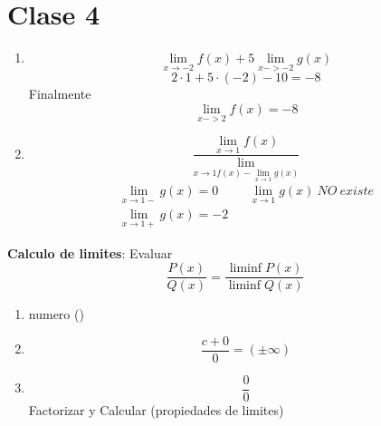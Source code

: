 \documentclass{article}
\begin{document}
    \section{Clase 4}
    \begin{enumerate}
        \item 
        \begin{equation}
            \lim_{x\rightarrow-2} f(x) + 5 \lim_{x->-2}g(x)
        \end{equation}
        \begin{equation}
            2 \cdot 1 + 5 \cdot (-2) - 10 = -8
        \end{equation}
        Finalmente
        \begin{equation}
            \lim_{x->2} f(x) = -8
        \end{equation}
        \item \begin{equation}
            \frac{\lim_{x\rightarrow1}f(x)}{\lim_{x\rightarrow1 f(x)- \lim_{x\rightarrow1}g(x)}}
        \end{equation}
        \begin{equation}
            \begin{aligned}
                  \lim_{x\rightarrow1-}g(x)=0 && \lim_{x\rightarrow1}g(x)\  NO \ existe \\ 
                \lim_{x\rightarrow1+}g(x)=-2&&
            \end{aligned}
        \end{equation}

    \end{enumerate}
    \textbf{Calculo de limites}:
    Evaluar
        \begin{equation}
            \frac{P(x)}{Q(x)} = \frac{\liminf P(x)}{\liminf Q(x)}
        \end{equation}
    \begin{enumerate}
        
        \item numero ()
        \item \begin{equation}
            \frac{c+0}{0} = (\pm \infty )
        \end{equation}
        \item \begin{equation}
            \frac{0}{0}
        \end{equation} Factorizar y Calcular (propiedades de limites)
    \end{enumerate}
               
          
        
\end{document}
